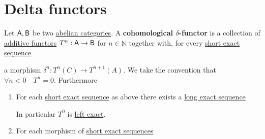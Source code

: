 \documentclass[../../../main]{subfiles}
\begin{document}
\section{Delta functors}

\begin{definition} \label{def:delta-functor}
  Let \(\mathsf{A}, \mathsf{B}\) be two \hyperref[def:abelian-category]{abelian categories}.
  A \textbf{cohomological \(\delta\)-functor} is a collection of \hyperref[def:additive-functor]{additive functors} \(T^{n}: \mathsf{A} \to \mathsf{B}\) for \(n \in \mathbb{N}\) together with, for every \hyperref[def:short-exact-sequence]{short exact sequence}
  \begin{center}
  \end{center}
  a morphism \(\delta^{n}: T^{n}(C) \to T^{n+1}(A)\). We take the convention that \(\forall n < 0 \quad T^{n} = 0\).
  Furthermore
  \begin{enumerate}
    \item For each \hyperref[def:short-exact-sequence]{short exact sequence} as above there exists a \hyperref[def:exact-sequence]{long exact sequence}
          \begin{center}
          \end{center}
          In particular \(T^{0}\) is \hyperref[def:exact-functor]{left exact}.
    \item For each morphism of \hyperref[def:short-exact-sequence]{short exact sequences}

\end{enumerate}
\end{definition}
\end{document}
